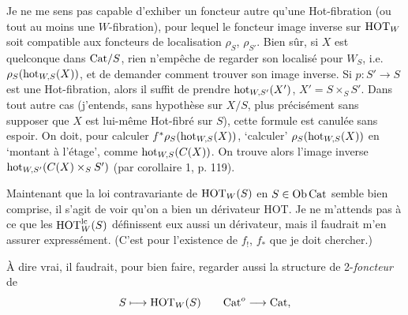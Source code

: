 Je ne me sens pas capable d'exhiber un foncteur autre qu'une Hot-fibration (ou tout au moins une $W$-fibration), pour lequel le foncteur image inverse sur $\mathrm{HOT}_W$ soit compatible aux foncteurs de localisation $\rho_S$, $\rho_{S'}$. Bien sûr, si $X$ est quelconque dans $\mathrm{Cat}/S$, rien n'empêche de regarder son localisé pour $W_S$, i.e. $\rho_S(\mathrm{hot}_{W,S}(X))$, et de demander comment trouver son image inverse. Si $p : S' \longrightarrow S$ est une Hot-fibration, alors il suffit de prendre $\mathrm{hot}_{W,S'}(X')$, $X' = S \times_S S'$. Dans tout autre cas (j'entends, sans hypothèse sur $X/S$, plus %
précisément sans supposer que $X$ est lui-même Hot-fibré sur $S$), cette formule est canulée sans espoir. On doit, pour calculer $f^*\rho_S(\mathrm{hot}_{W,S}(X))$, `calculer' $\rho_S(\mathrm{hot}_{W,S}(X))$ en `montant à l'étage', comme $\mathrm{hot}_{W,S}(C(X))$. On trouve alors l'image inverse $\mathrm{hot}_{W,S'}(C(X) \times_S S')$ (par corollaire 1, p. 119).

Maintenant que la loi contravariante de $\mathrm{HOT}_W(S)$ en $S \in \mathrm{Ob}\,\mathrm{Cat}$ semble bien comprise, il s'agit de voir qu'on a bien un dérivateur HOT. Je ne m'attends pas à ce que les $\mathrm{HOT}_W^{\mathrm{lc}}(S)$
définissent eux aussi un dérivateur, mais il faudrait m'en assurer expressément. (C'est pour l'existence de $f_!$, $f_*$ que je doit chercher.) %

À dire vrai, il faudrait, pour bien faire, regarder aussi la structure de 2-\textit{foncteur} de
\[
S \longmapsto \mathrm{HOT}_W(S) \qquad \mathrm{Cat}^o \longrightarrow \mathrm{Cat},
\]


